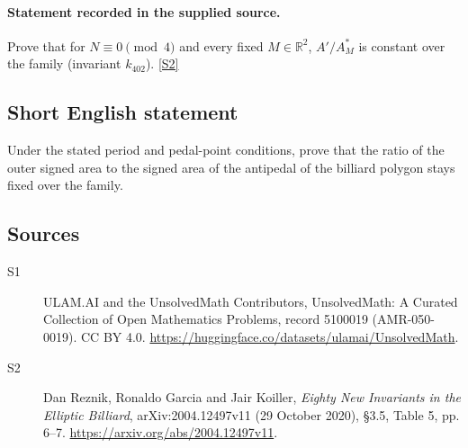 \documentclass[11pt]{article}
\newcommand{\sref}[2]{\hyperlink{source:#1:#2}{[S#2]}}
\begin{document}
\paragraph{Statement recorded in the supplied source.}
Prove that for $N\equiv0\pmod4$ and every fixed $M\in\mathbb R^2$, $A'/A_M^*$ is constant over the family (invariant $k_{402}$). \sref{5100019}{2}
\subsection{Short English statement}
Under the stated period and pedal-point conditions, prove that the ratio of the outer signed area to the signed area of the antipedal of the billiard polygon stays fixed over the family.
\subsection{Sources}
\begin{description}
\item[\hypertarget{source:5100019:1}{S1}] ULAM.AI and the UnsolvedMath Contributors, UnsolvedMath: A Curated Collection of Open Mathematics Problems, record 5100019 (AMR-050-0019). CC BY 4.0. \url{https://huggingface.co/datasets/ulamai/UnsolvedMath}.
\item[\hypertarget{source:5100019:2}{S2}] Dan Reznik, Ronaldo Garcia and Jair Koiller, \emph{Eighty New Invariants in the Elliptic Billiard}, arXiv:2004.12497v11 (29 October 2020), \S3.5, Table 5, pp. 6--7. \url{https://arxiv.org/abs/2004.12497v11}.
\end{description}
\label{end:5100019}
\end{document}
